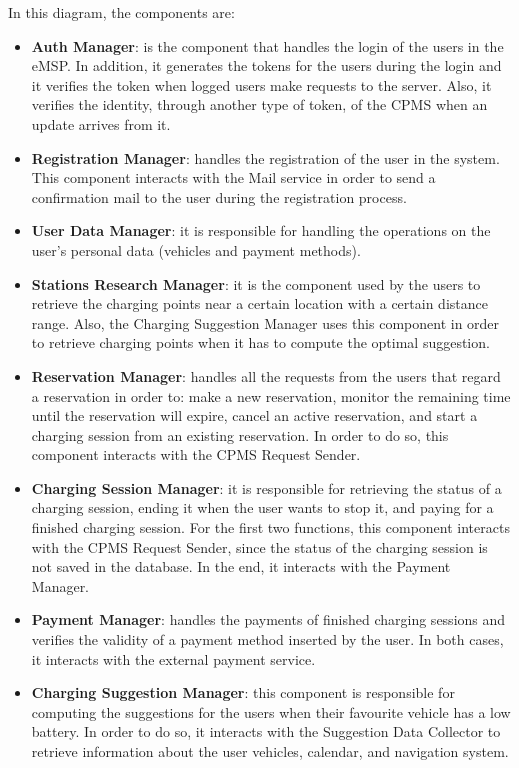 \documentclass{Configuration_Files/PoliMi3i_thesis}
\begin{document}
In this diagram, the components are:
\begin{itemize}
    \item \textbf{Auth Manager}: is the component that handles the login of the users in the eMSP. In addition, it generates the tokens for the users during the login and it verifies the token when logged users make requests to the server. Also, it verifies the identity, through another type of token, of the CPMS when an update arrives from it.
    \item \textbf{Registration Manager}: handles the registration of the user in the system. This component interacts with the Mail service in order to send a confirmation mail to the user during the registration process.
    \item \textbf{User Data Manager}: it is responsible for handling the operations on the user's personal data (vehicles and payment methods).
    \item \textbf{Stations Research Manager}: it is the component used by the users to retrieve the charging points near a certain location with a certain distance range. Also, the Charging Suggestion Manager uses this component in order to retrieve charging points when it has to compute the optimal suggestion.
    \item \textbf{Reservation Manager}: handles all the requests from the users that regard a reservation in order to: make a new reservation, monitor the remaining time until the reservation will expire, cancel an active reservation, and start a charging session from an existing reservation. In order to do so, this component interacts with the CPMS Request Sender.
    \item \textbf{Charging Session Manager}: it is responsible for retrieving the status of a charging session, ending it when the user wants to stop it, and paying for a finished charging session. For the first two functions, this component interacts with the CPMS Request Sender, since the status of the charging session is not saved in the database. In the end, it interacts with the Payment Manager.
    \item \textbf{Payment Manager}: handles the payments of finished charging sessions and verifies the validity of a payment method inserted by the user. In both cases, it interacts with the external payment service.
    \item \textbf{Charging Suggestion Manager}: this component is responsible for computing the suggestions for the users when their favourite vehicle has a low battery. In order to do so, it interacts with the Suggestion Data Collector to retrieve information about the user vehicles, calendar, and navigation system.

\end{itemize}
\end{document}
